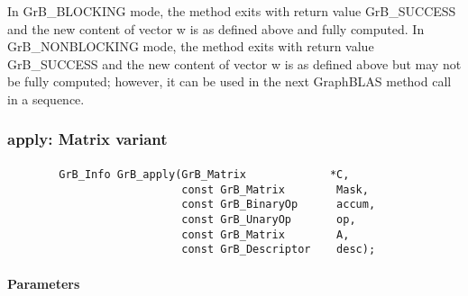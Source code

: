 In {\sf GrB\_BLOCKING} mode, the method exits with return value 
{\sf GrB\_SUCCESS} and the new content of vector {\sf w} is as defined above
and fully computed.  
In {\sf GrB\_NONBLOCKING} mode, the method exits with return value 
{\sf GrB\_SUCCESS} and the new content of vector {\sf w} is as defined above 
but may not be fully computed; however, it can be used in the next GraphBLAS 
method call in a sequence.


\subsubsection{{\sf apply}: Matrix variant}

\paragraph{\syntax}

\begin{verbatim}
        GrB_Info GrB_apply(GrB_Matrix             *C,
                           const GrB_Matrix        Mask,
                           const GrB_BinaryOp      accum,
                           const GrB_UnaryOp       op,
                           const GrB_Matrix        A,
                           const GrB_Descriptor    desc);
\end{verbatim}

\paragraph{Parameters}

